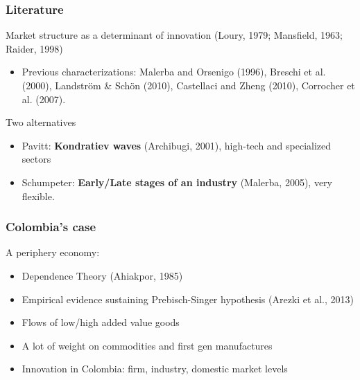 \documentclass{beamer}
\begin{document}
	\begin{frame}
		\frametitle{Literature}
		Market structure as a determinant of innovation (Loury, 1979; Mansfield, 1963; Raider, 1998)
		\begin{itemize}
			\item Previous characterizations: Malerba and Orsenigo (1996), Breschi et al. (2000), Landström \& Schön (2010), Castellaci and Zheng (2010), Corrocher et al. (2007).
		\end{itemize}
		Two alternatives
		\begin{itemize}
			\item Pavitt: \textbf{Kondratiev waves} (Archibugi, 2001), high-tech and specialized sectors
			\item Schumpeter: \textbf{Early/Late stages of an industry} (Malerba, 2005), very flexible.
		\end{itemize}
	\end{frame}
	\begin{frame}
		\frametitle{Colombia's case}
	A periphery economy:
	\begin{itemize}
		\item Dependence Theory (Ahiakpor, 1985)
		\item Empirical evidence sustaining Prebisch-Singer hypothesis (Arezki et al., 2013)
		\item Flows of low/high added value goods
		\item A lot of weight on commodities and first gen manufactures
		\item Innovation in Colombia: firm, industry, domestic market levels
	\end{itemize}
	\end{frame}
\end{document}
